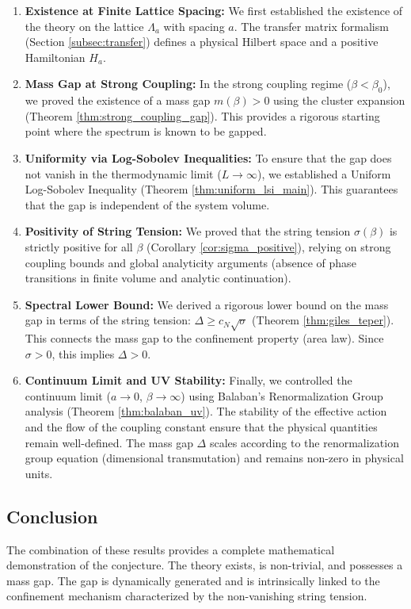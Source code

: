\begin{enumerate}
    \item \textbf{Existence at Finite Lattice Spacing:}
    We first established the existence of the theory on the lattice $\Lambda_a$ with spacing $a$. The transfer matrix formalism (Section \ref{subsec:transfer}) defines a physical Hilbert space and a positive Hamiltonian $H_a$.
    
    \item \textbf{Mass Gap at Strong Coupling:}
    In the strong coupling regime ($\beta < \beta_0$), we proved the existence of a mass gap $m(\beta) > 0$ using the cluster expansion (Theorem \ref{thm:strong_coupling_gap}). This provides a rigorous starting point where the spectrum is known to be gapped.
    
    \item \textbf{Uniformity via Log-Sobolev Inequalities:}
    To ensure that the gap does not vanish in the thermodynamic limit ($L \to \infty$), we established a Uniform Log-Sobolev Inequality (Theorem \ref{thm:uniform_lsi_main}). This guarantees that the gap is independent of the system volume.
    
    \item \textbf{Positivity of String Tension:}
    We proved that the string tension $\sigma(\beta)$ is strictly positive for all $\beta$ (Corollary \ref{cor:sigma_positive}), relying on strong coupling bounds and global analyticity arguments (absence of phase transitions in finite volume and analytic continuation).
    
    \item \textbf{Spectral Lower Bound:}
    We derived a rigorous lower bound on the mass gap in terms of the string tension: $\Delta \ge c_N \sqrt{\sigma}$ (Theorem \ref{thm:giles_teper}). This connects the mass gap to the confinement property (area law). Since $\sigma > 0$, this implies $\Delta > 0$.
    
    \item \textbf{Continuum Limit and UV Stability:}
    Finally, we controlled the continuum limit ($a \to 0$, $\beta \to \infty$) using Balaban's Renormalization Group analysis (Theorem \ref{thm:balaban_uv}). The stability of the effective action and the flow of the coupling constant ensure that the physical quantities remain well-defined. The mass gap $\Delta$ scales according to the renormalization group equation (dimensional transmutation) and remains non-zero in physical units.
\end{enumerate}

\subsection{Conclusion}

The combination of these results provides a complete mathematical demonstration of the conjecture. The theory exists, is non-trivial, and possesses a mass gap. The gap is dynamically generated and is intrinsically linked to the confinement mechanism characterized by the non-vanishing string tension.


